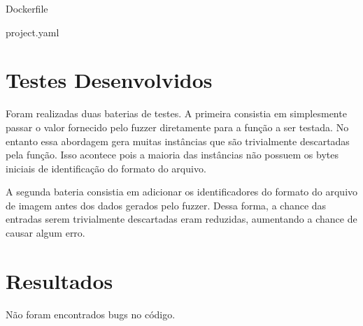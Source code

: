 \documentclass[a4paper,12pt]{article}
\begin{document}
Dockerfile






project.yaml


\section{Testes Desenvolvidos}

Foram realizadas duas baterias de testes. A primeira consistia
em simplesmente passar o valor fornecido pelo fuzzer diretamente para
a função a ser testada. No entanto essa abordagem gera muitas instâncias
que são trivialmente descartadas pela função. Isso acontece pois
a maioria das instâncias não possuem os bytes iniciais de identificação
do formato do arquivo.

A segunda bateria consistia em adicionar os identificadores do formato
do arquivo de imagem antes dos dados gerados pelo fuzzer. Dessa forma,
a chance das entradas serem trivialmente descartadas eram reduzidas,
aumentando a chance de causar algum erro.

\section{Resultados}

Não foram encontrados bugs no código.
\end{document}
